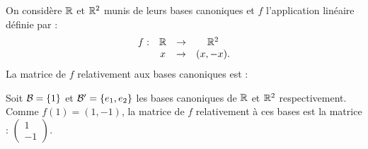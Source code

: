 \begin{question}
On considère $\mathbb{R}$ et $\mathbb{R}^2$ munis de leurs bases canoniques et $f$ l'application linéaire définie par :
$$\begin{array}{rccc}f:&\mathbb{R} &\to& \mathbb{R}^2\\
& x&\to &(x,-x).  \end{array}$$
La matrice de $f$ relativement aux bases canoniques  est :
\begin{answers}  
\end{answers}
\begin{explanations} Soit ${\cal {B}} =\{1\}$ et ${\cal {B}}'=\{e_1,e_2\}$ les bases canoniques de $\mathbb{R}$ et $\mathbb{R}^2$ respectivement. Comme $f(1)= (1,-1)$, la matrice de $f$  relativement à ces bases est la matrice : $\left(\begin{array}{rc}1\\-1\end{array}\right).$
\end{explanations}
\end{question}

